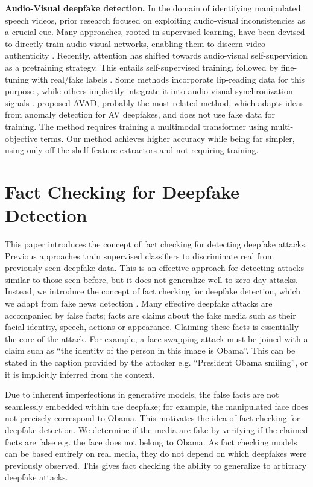 \documentclass{article} \usepackage{iclr2024_conference,times}
\begin{document}
\textbf{Audio-Visual deepfake detection.} In the domain of identifying manipulated speech videos, prior research focused on exploiting audio-visual inconsistencies as a crucial cue. Many approaches, rooted in supervised learning, have been devised to directly train audio-visual networks, enabling them to discern video authenticity \citep{av_related1,av_related2}. Recently, attention has shifted towards audio-visual self-supervision as a pretraining strategy. This entails self-supervised training, followed by fine-tuning with real/fake labels \citep{byol,real_forensics}. Some methods incorporate lip-reading data for this purpose \citep{lip_forensics}, while others implicitly integrate it into audio-visual synchronization signals \citep{AD_DFD}. \citet{owens} proposed AVAD, probably the most related method, which adapts ideas from anomaly detection for AV deepfakes, and does not use fake data for training. The method requires training a multimodal transformer using multi-objective terms. Our method achieves higher accuracy while being far simpler, using only off-the-shelf feature extractors and not requiring training.

\section{Fact Checking for Deepfake Detection}
\label{sec:factchecking}

This paper introduces the concept of fact checking for detecting deepfake attacks. Previous approaches train supervised classifiers to discriminate real from previously seen deepfake data. This is an effective approach for detecting attacks similar to those seen before, but it does not generalize well to zero-day attacks. Instead, we introduce the concept of fact checking for deepfake detection, which we adapt from fake news detection \citep{fake_news_1,fake_news_2,fake_news_3}. Many effective deepfake attacks are accompanied by false facts; facts are claims about the fake media such as their facial identity, speech, actions or appearance. Claiming these facts is essentially the core of the attack. For example, a face swapping attack must be joined with a claim such as “the identity of the person in this image is Obama”. This can be stated in the caption provided by the attacker e.g. “President Obama smiling”, or it is implicitly inferred from the context.

Due to inherent imperfections in generative models, the false facts are not seamlessly embedded within the deepfake; for example, the manipulated face does not precisely correspond to Obama. This motivates the idea of fact checking for deepfake detection. We determine if the media are fake by verifying if the claimed facts are false e.g. the face does not belong to Obama. As fact checking models can be based entirely on real media, they do not depend on which deepfakes were previously observed. This gives fact checking the ability to generalize to arbitrary deepfake attacks.
\end{document}
